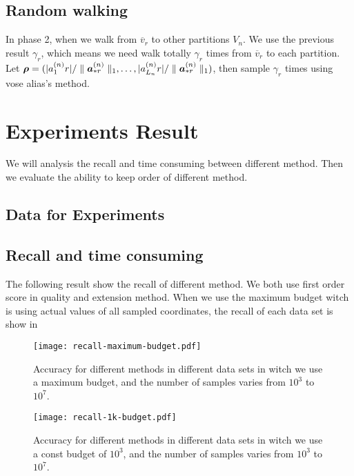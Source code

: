 \documentclass{article}
\newcommand{\V}[1]{{\bm{{\MakeLowercase{#1}}}}}
\newcommand{\Vacol}[1]{\V{a}^{(#1)}_{*r}}
\newcommand{\norm}[2]{\parallel#1\parallel_{#2}}
\begin{document}
\subsection{Random walking}

In phase 2, when we walk from $\overline{v}_r$ to other partitions $V_n$. We use the previous result $\gamma_{r}$, which means we need walk totally $\gamma_{r}$ times from $\overline{v}_r$ to each  partition. Let $\V{\rho} = (|{a}^{(n)}_{1}{r}|/\norm{\Vacol{n}}{1},\ldots,|{a}^{(n)}_{L_n}{r}|/\norm{\Vacol{n}}{1})$, then sample $\gamma_{r}$ times using vose alias's method.
\section{Experiments Result}
We will analysis the recall and time consuming  between different method. Then we evaluate the ability to keep order of different method.
\subsection{Data for Experiments}

\subsection{Recall and time consuming}
The following result show the recall of different method. We both use first order score in quality and extension method.
When we use the maximum budget witch is using actual values of all sampled coordinates, the recall of each data set is show in ~

\begin{figure}[ht]
  \centering
  \texttt{[image: recall-maximum-budget.pdf]}\\
  \caption{Accuracy for different methods in different data sets in witch we use a maximum budget, and the number of samples varies from $10^3$ to $10^7$.}
  \label{Fig:RecallMaxBudget}
\end{figure}

\begin{figure}[ht]
  \centering
  \texttt{[image: recall-1k-budget.pdf]}\\
  \caption{Accuracy for different methods in different data sets in witch we use a const budget of $10^3$, and the number of samples varies from $10^3$ to $10^7$.}
  \label{Fig:Recall1kBudget}
\end{figure}
\end{document}
